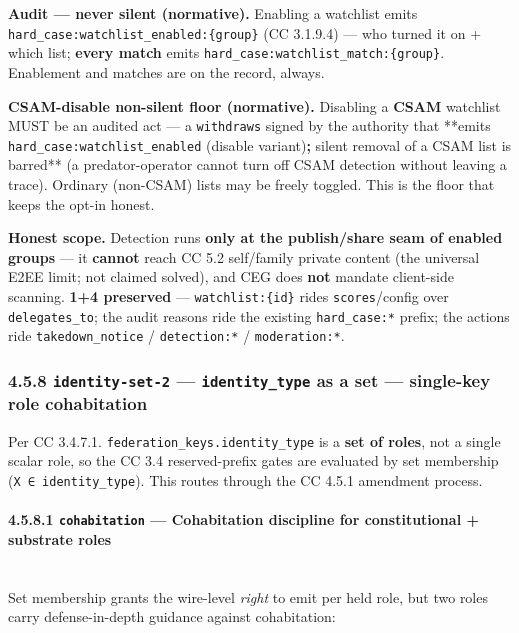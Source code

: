 \documentclass[11pt]{article}
\begin{document}
\textbf{Audit — never silent (normative).} Enabling a watchlist emits \texttt{hard\_case:watchlist\_enabled:\{group\}} (CC 3.1.9.4) — who turned it on + which list; \textbf{every match} emits \texttt{hard\_case:watchlist\_match:\{group\}}. Enablement and matches are on the record, always.


\textbf{CSAM-disable non-silent floor (normative).} Disabling a \textbf{CSAM} watchlist MUST be an audited act — a \texttt{withdraws} signed by the authority that **emits \texttt{hard\_case:watchlist\_enabled} (disable variant)\textbf{; }silent removal of a CSAM list is barred** (a predator-operator cannot turn off CSAM detection without leaving a trace). Ordinary (non-CSAM) lists may be freely toggled. This is the floor that keeps the opt-in honest.


\textbf{Honest scope.} Detection runs \textbf{only at the publish/share seam of enabled groups} — it \textbf{cannot} reach CC 5.2 self/family private content (the universal E2EE limit; not claimed solved), and CEG does \textbf{not} mandate client-side scanning. \textbf{1+4 preserved} — \texttt{watchlist:\{id\}} rides \texttt{scores}/config over \texttt{delegates\_to}; the audit reasons ride the existing \texttt{hard\_case:*} prefix; the actions ride \texttt{takedown\_notice} / \texttt{detection:*} / \texttt{moderation:*}.


\subsubsection*{4.5.8 \texttt{identity-set-2} — \texttt{identity\_type} as a set — single-key role cohabitation}


Per CC 3.4.7.1. \texttt{federation\_keys.identity\_type} is a \textbf{set of roles}, not a single scalar role, so the CC 3.4 reserved-prefix gates are evaluated by set membership (\texttt{X ∈ identity\_type}). This routes through the CC 4.5.1 amendment process.


\paragraph{4.5.8.1 \texttt{cohabitation} — Cohabitation discipline for constitutional + substrate roles}\mbox{}\\


Set membership grants the wire-level \textit{right} to emit per held role, but two roles carry defense-in-depth guidance against cohabitation:
\end{document}
